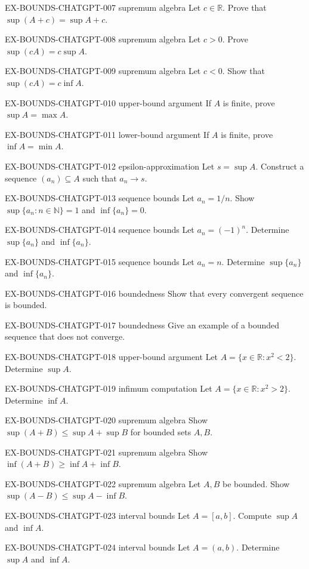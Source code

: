\exstubgen
{EX-BOUNDS-CHATGPT-007}
{supremum algebra}
{Let $c\in\mathbb R$. Prove that $\sup(A+c)=\sup A+c$.}

\exstubgen
{EX-BOUNDS-CHATGPT-008}
{supremum algebra}
{Let $c>0$. Prove $\sup(cA)=c\sup A$.}

\exstubgen
{EX-BOUNDS-CHATGPT-009}
{supremum algebra}
{Let $c<0$. Show that $\sup(cA)=c\inf A$.}

\exstubgen
{EX-BOUNDS-CHATGPT-010}
{upper-bound argument}
{If $A$ is finite, prove $\sup A = \max A$.}

\exstubgen
{EX-BOUNDS-CHATGPT-011}
{lower-bound argument}
{If $A$ is finite, prove $\inf A = \min A$.}

\exstubgen
{EX-BOUNDS-CHATGPT-012}
{epsilon-approximation}
{Let $s=\sup A$. Construct a sequence $(a_n)\subseteq A$ such that $a_n\to s$.}

\exstubgen
{EX-BOUNDS-CHATGPT-013}
{sequence bounds}
{Let $a_n=1/n$. Show $\sup\{a_n:n\in\mathbb N\}=1$ and $\inf\{a_n\}=0$.}

\exstubgen
{EX-BOUNDS-CHATGPT-014}
{sequence bounds}
{Let $a_n=(-1)^n$. Determine $\sup\{a_n\}$ and $\inf\{a_n\}$.}

\exstubgen
{EX-BOUNDS-CHATGPT-015}
{sequence bounds}
{Let $a_n=n$. Determine $\sup\{a_n\}$ and $\inf\{a_n\}$.}

\exstubgen
{EX-BOUNDS-CHATGPT-016}
{boundedness}
{Show that every convergent sequence is bounded.}

\exstubgen
{EX-BOUNDS-CHATGPT-017}
{boundedness}
{Give an example of a bounded sequence that does not converge.}

\exstubgen
{EX-BOUNDS-CHATGPT-018}
{upper-bound argument}
{Let $A=\{x\in\mathbb R: x^2<2\}$. Determine $\sup A$.}

\exstubgen
{EX-BOUNDS-CHATGPT-019}
{infimum computation}
{Let $A=\{x\in\mathbb R: x^2>2\}$. Determine $\inf A$.}

\exstubgen
{EX-BOUNDS-CHATGPT-020}
{supremum algebra}
{Show $\sup(A+B)\le \sup A + \sup B$ for bounded sets $A,B$.}

\exstubgen
{EX-BOUNDS-CHATGPT-021}
{supremum algebra}
{Show $\inf(A+B)\ge \inf A + \inf B$.}

\exstubgen
{EX-BOUNDS-CHATGPT-022}
{supremum algebra}
{Let $A,B$ be bounded. Show $\sup(A-B)\le \sup A - \inf B$.}

\exstubgen
{EX-BOUNDS-CHATGPT-023}
{interval bounds}
{Let $A=[a,b]$. Compute $\sup A$ and $\inf A$.}

\exstubgen
{EX-BOUNDS-CHATGPT-024}
{interval bounds}
{Let $A=(a,b)$. Determine $\sup A$ and $\inf A$.}

